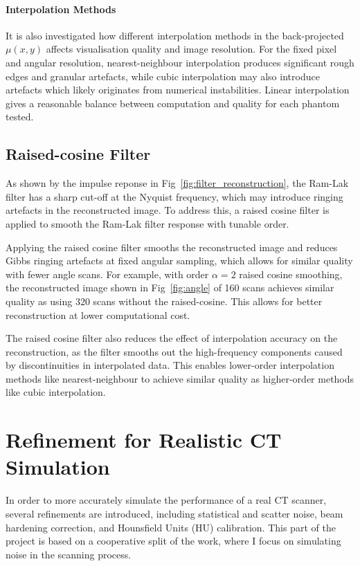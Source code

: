 \documentclass[10pt,twocolumn]{article}
\begin{document}
\paragraph{Interpolation Methods}
It is also investigated how different interpolation methods in the back-projected $\mu(x, y)$ affects visualisation quality and image resolution. For the fixed pixel and angular resolution, nearest-neighbour interpolation produces significant rough edges and granular artefacts, while cubic interpolation may also introduce artefacts which likely originates from numerical instabilities.
Linear interpolation gives a reasonable balance between computation and quality for each phantom tested.

\subsection{Raised-cosine Filter}
As shown by the impulse reponse in Fig~\ref{fig:filter_reconstruction}, the Ram-Lak filter has a sharp cut-off at the Nyquist frequency, which may introduce ringing artefacts in the reconstructed image.
To address this, a raised cosine filter is applied to smooth the Ram-Lak filter response with tunable order.

Applying the raised cosine filter smooths the reconstructed image and reduces Gibbs ringing artefacts at fixed angular sampling\cite{JEZZARD2000425}, which allows for similar quality with fewer angle scans.
For example, with order $\alpha=2$ raised cosine smoothing, the reconstructed image shown in Fig~\ref{fig:angle} of 160 scans achieves similar quality as using 320 scans without the raised-cosine. This allows for better reconstruction at lower computational cost.

The raised cosine filter also reduces the effect of interpolation accuracy on the reconstruction, as the filter smooths out the high-frequency components caused by discontinuities in interpolated data. This enables lower-order interpolation methods like nearest-neighbour to achieve similar quality as higher-order methods like cubic interpolation.

\section{Refinement for Realistic CT Simulation}
In order to more accurately simulate the performance of a real CT scanner, several refinements are introduced, including statistical and scatter noise, beam hardening correction, and Hounsfield Units (HU) calibration.
This part of the project is based on a cooperative split of the work, where I focus on simulating noise in the scanning process.
\end{document}
